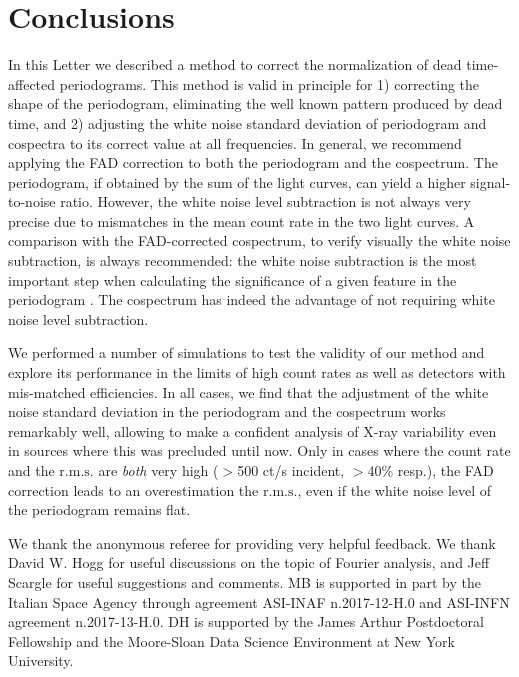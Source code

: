 \documentclass[twocolumn]{aastex61}
\newcommand{\rms}{\ensuremath{\mathrm{r.m.s.}}\xspace}
\begin{document}

\section{Conclusions}
In this Letter we described a method to correct the normalization of dead time-affected periodograms.
This method is valid in principle for 
1) correcting the shape of the periodogram, eliminating the well known pattern produced by dead time, and 
2) adjusting the white noise standard deviation of periodogram and cospectra to its correct value at all frequencies.
In general, we recommend applying the FAD correction to both the periodogram and the cospectrum. 
The periodogram, if obtained by the sum of the light curves, can yield a higher signal-to-noise ratio.
However, the white noise level subtraction is not always very precise due to mismatches in the mean count rate in the two light curves. 
A comparison with the FAD-corrected cospectrum, to verify visually the white noise subtraction, is always recommended: the white noise subtraction is the most important step when calculating the significance of a given feature in the periodogram \citep[e.g.][]{Barret+12,Huppenkothen+17}.
The cospectrum has indeed the advantage of not requiring white noise level subtraction.

We performed a number of simulations to test the validity of our method and explore its performance in the limits of high count rates as well as detectors with mis-matched efficiencies. 
In all cases, we find that the adjustment of the white noise standard deviation in the periodogram and the cospectrum works remarkably well, allowing to make a confident analysis of X-ray variability even in sources where this was precluded until now.
Only in cases where the count rate and the \rms are \textit{both} very high ($>$500 ct/s incident, $>$40\% resp.), the FAD correction leads to an overestimation the \rms, even if the white noise level of the periodogram remains flat.

\acknowledgments
We thank the anonymous referee for providing very helpful feedback.
We thank David W. Hogg for useful discussions on the topic of Fourier analysis, and Jeff Scargle for useful suggestions and comments.
MB is supported in part by the Italian Space Agency through agreement ASI-INAF n.2017-12-H.0 and ASI-INFN agreement n.2017-13-H.0.
DH is supported by the James Arthur Postdoctoral Fellowship and the Moore-Sloan Data Science Environment at New York University.
\end{document}
